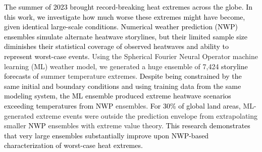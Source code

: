 \documentclass[draft]{agujournal2019}
\renewcommand{\st}[1]{\unskip}
\newcommand{\newTxt}{\textcolor{black}}
\begin{document}
\noindent
\st{The summer of 2023 was the second hottest on record, with numerous extreme heatwaves across the globe.}
\newTxt{The summer of 2023 brought record-breaking heat extremes across the globe. In this work, we investigate how much worse these extremes might have become, given identical large-scale conditions. Numerical weather prediction (NWP) ensembles simulate alternate heatwave storylines, but their limited sample size diminishes their statistical coverage of observed heatwaves and ability to represent worst-case events.} Using the Spherical Fourier Neural Operator machine learning (ML) weather model, we generated a huge ensemble of 7,424 \st{weather scenarios simulating} \newTxt{storyline forecasts of} summer temperature extremes. \st{The ML ensemble produced extreme heatwave scenarios exceeding temperatures from reanalysis and numerical weather prediction ensembles} \newTxt{Despite being constrained by the same initial and boundary conditions and using training data from the same modeling system,} \st{our results show that} \newTxt{the ML ensemble produced extreme heatwave scenarios exceeding temperatures from NWP} ensembles. \st{the ML model's extreme surface temperatures were not unusual for approximately two-thirds of the global land area. However, for the other} 
\newTxt{For 30\% of global land areas,} ML-generated extreme events were \st{well} outside the prediction envelope from extrapolating smaller \newTxt{NWP} ensembles with extreme value theory. 
\st{The ML ensemble also readily generates storyline simulations of humid heat extremes, which yield more dangerous categories of public safety alerts than can be simulated from smaller ensembles.} 
\st{This research highlights the potential of huge ensemble simulations to improve prediction of worst-case humid and dry temperature extremes.}  \newTxt{This research demonstrates that very large ensembles substantially improve upon NWP-based characterization of worst-case heat extremes.}

\end{document}
